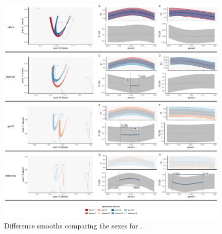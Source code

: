 \begin{figure}[p]
    \centering
    \includegraphics[width=\textwidth]{Figures/BET/BET_sex_panel_plot.pdf}
    \caption{Difference smooths comparing the sexes for \bet.}
    \label{fig:bet_diff_smooths_sex_gen}
\end{figure}



